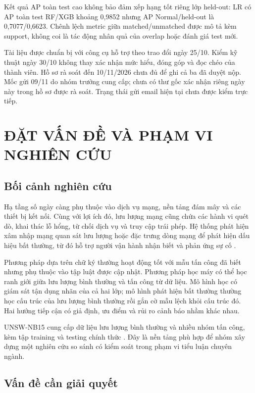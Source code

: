 \documentclass[12pt,a4paper,oneside]{report}
\begin{document}
Kết quả AP toàn test cao không bảo đảm xếp hạng tốt riêng lớp held-out: LR có AP toàn test RF/XGB khoảng 0,9852 nhưng AP Normal/held-out là 0,7077/0,6623. Chênh lệch metric giữa matched/unmatched được mô tả kèm support, không coi là tác động nhân quả của overlap hoặc đánh giá test mới.

Tài liệu được chuẩn bị với công cụ hỗ trợ theo trao đổi ngày 25/10. Kiểm kỹ thuật ngày 30/10 không thay xác nhận mức hiểu, đóng góp và đọc chéo của thành viên. Hồ sơ rà soát đến 10/11/2026 chưa đủ để ghi cả ba đã duyệt nộp. Mốc gửi 09/11 do nhóm trưởng cung cấp; chưa có thư gốc xác nhận riêng ngày này trong hồ sơ được rà soát. Trạng thái gửi email hiện tại chưa được kiểm trực tiếp.

\clearpage{}
\chapter{ĐẶT VẤN ĐỀ VÀ PHẠM VI NGHIÊN CỨU}

\section{Bối cảnh nghiên cứu}

Hạ tầng số ngày càng phụ thuộc vào dịch vụ mạng, nền tảng đám mây và các thiết bị kết nối. Cùng với lợi ích đó, lưu lượng mạng cũng chứa các hành vi quét dò, khai thác lỗ hổng, từ chối dịch vụ và truy cập trái phép. Hệ thống phát hiện xâm nhập mạng quan sát lưu lượng hoặc đặc trưng dòng mạng để phát hiện dấu hiệu bất thường, từ đó hỗ trợ người vận hành nhận biết và phản ứng sự cố \cite{nist80094}.

Phương pháp dựa trên chữ ký thường hoạt động tốt với mẫu tấn công đã biết nhưng phụ thuộc vào tập luật được cập nhật. Phương pháp học máy có thể học ranh giới giữa lưu lượng bình thường và tấn công từ dữ liệu. Mô hình học có giám sát tận dụng nhãn của cả hai lớp; mô hình phát hiện bất thường thường học cấu trúc của lưu lượng bình thường rồi gắn cờ mẫu lệch khỏi cấu trúc đó. Hai hướng tiếp cận có giả định, ưu điểm và rủi ro cảnh báo nhầm khác nhau.

UNSW-NB15 cung cấp dữ liệu lưu lượng bình thường và nhiều nhóm tấn công, kèm tập training và testing chính thức \cite{moustafa2015,moustafa2016,unswsite}. Đây là nền tảng phù hợp để nhóm xây dựng một nghiên cứu so sánh có kiểm soát trong phạm vi tiểu luận chuyên ngành.

\section{Vấn đề cần giải quyết}
\end{document}
